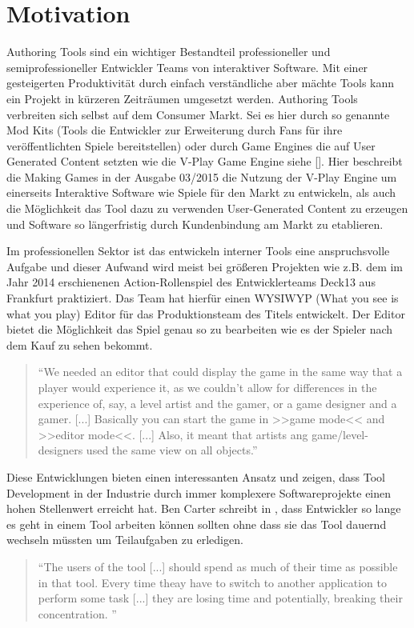 \documentclass[pagesize, paper=a4, fontsize=12pt, titlepage=true, headings=small, headnosepline, abstractoff, liststotoc, nochapterprefix, plainheadsepline, twoside]{scrreprt}
\begin{document}
\section{Motivation}
Authoring Tools sind ein wichtiger Bestandteil professioneller und semiprofessioneller Entwickler Teams von interaktiver Software. Mit einer gesteigerten Produktivität durch einfach verständliche aber mächte Tools kann ein Projekt in kürzeren Zeiträumen umgesetzt werden. Authoring Tools verbreiten sich selbst auf dem Consumer Markt. Sei es hier durch so genannte Mod Kits (Tools die Entwickler zur Erweiterung durch Fans für ihre veröffentlichten Spiele bereitstellen) oder durch Game Engines die auf User Generated Content setzten wie die V-Play Game Engine siehe []. Hier beschreibt die Making Games in der Ausgabe 03/2015 die Nutzung der V-Play Engine um einerseits Interaktive Software wie Spiele für den Markt zu entwickeln, als auch die Möglichkeit das Tool dazu zu verwenden User-Generated Content zu erzeugen und Software so längerfristig durch Kundenbindung am Markt zu etablieren.

Im professionellen Sektor ist das entwickeln interner Tools eine anspruchsvolle Aufgabe und dieser Aufwand wird meist bei größeren Projekten wie z.B. dem im Jahr 2014 erschienenen Action-Rollenspiel  des Entwicklerteams Deck13 aus Frankfurt praktiziert. Das Team hat hierfür einen WYSIWYP (What you see is what you play) Editor für das Produktionsteam des Titels entwickelt. Der Editor bietet die Möglichkeit das Spiel genau so zu bearbeiten wie es der Spieler nach dem Kauf zu sehen bekommt.
\begin{quote}
“We needed an editor that could display the game in the same way that a player would experience it, as we couldn’t allow for differences in the experience of, say, a level artist and the gamer, or a game designer and a gamer. [...] Basically you can start the game in >>game mode<< and >>editor mode<<.  [...] Also, it meant that artists ang game/level-designers used the same view on all objects.”

\end{quote}
Diese Entwicklungen bieten einen interessanten Ansatz und zeigen, dass Tool Development in der Industrie durch immer komplexere Softwareprojekte einen hohen Stellenwert erreicht hat.
Ben Carter schreibt in , dass Entwickler so lange es geht in einem Tool arbeiten können sollten ohne dass sie das Tool dauernd wechseln müssten um Teilaufgaben zu erledigen.
\begin{quote}
“The users of the tool [...] should spend as much of their time as possible in that tool. Every time theay have to switch to another application to perform some task [...] they are losing time and potentially, breaking their concentration. \cite[S. 18]{Carter2004}”
\end{quote}
\end{document}

